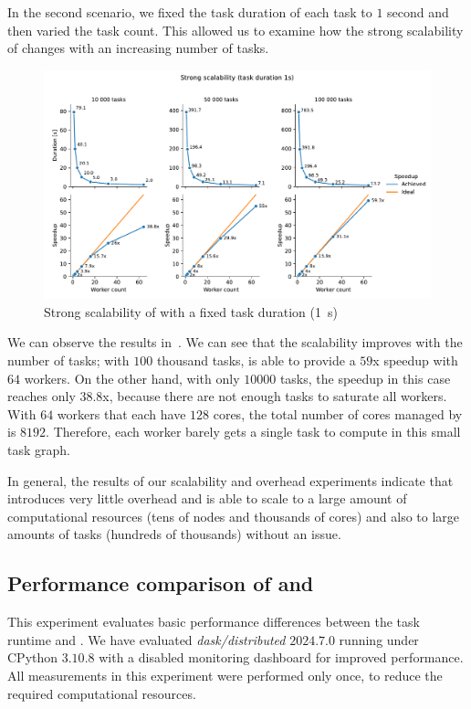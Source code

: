 In the second scenario, we fixed the task duration of each task to $1$ second
and then varied the task count. This allowed us to examine how the strong scalability of
\hyperqueue{} changes with an increasing number of tasks.

\begin{figure}[h]
	\centering
	\includegraphics[width=\textwidth]{imgs/hq/charts/scalability-fixed-task-duration}
	\caption{Strong scalability of \hyperqueue{} with a fixed task duration (\SI{1}{\second})}
	\label{fig:hq-scalability-fixed-task-duration}
\end{figure}

We can observe the results in~. We can see that the scalability improves
with the number of tasks; with $100$ thousand tasks, \hyperqueue{} is
able to provide a $59$x speedup with $64$ workers. On the
other hand, with only $10000$ tasks, the speedup in this case reaches only
$38.8$x, because there are not enough tasks to saturate all workers. With
$64$ workers that each have $128$ cores, the total number of
cores managed by \hq{} is $8192$. Therefore, each worker barely gets a single task to compute in
this small task graph.

In general, the results of our scalability and overhead experiments indicate that \hyperqueue{}
introduces very little overhead and is able to scale to a large amount of computational
resources (tens of nodes and thousands of cores) and also to large amounts of tasks
(hundreds of thousands) without an issue.

\subsection{Performance comparison of \dask{} and \hq{}}
\label{sec:hq-exp-dask}
This experiment evaluates basic performance differences between the \dask{} task
runtime and \hyperqueue{}. We have evaluated \emph{dask/distributed}
$2024.7.0$ running under CPython $3.10.8$ with a disabled monitoring
dashboard for improved performance. All measurements in this experiment were performed only once,
to reduce the required computational resources.

